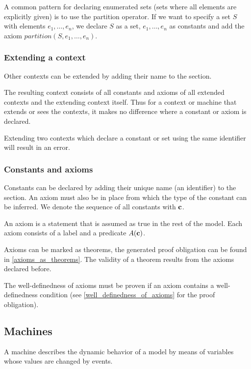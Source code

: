 A common pattern for declaring enumerated sets (sets where all elements are explicitly given)
is to use the partition operator. If we want to specify a set $S$ with elements $e_1,\ldots,e_n$,
we declare $S$ as a set, $e_1,\ldots,e_n$ as constants and add the axiom $partition(S,e_1,\ldots,e_n)$.

\subsubsection{Extending a context}
\label{extendind_a_context}
Other contexts can be extended by adding their name to the  section.

The resulting context consists of all constants and axioms of all extended contexts and the extending context itself.
Thus for a context or machine that extends or sees the contexts, it makes no difference where a constant or axiom is declared.

Extending two contexts which declare a constant or set using the same identifier will result in an error.

\subsubsection{Constants and axioms}
\label{constants_and_axioms}
Constants can be declared by adding their unique name (an identifier) to the  section.
An axiom must also be in place from which the type of the constant can be inferred.
We denote the sequence of all constants with $\mathbf{c}$.

An axiom is a statement that is assumed as true in the rest of the model.
Each axiom consists of a label and a predicate $A(\mathbf{c})$.

Axioms can be marked as theorems,
  the generated proof obligation can be found in \ref{axioms_as_theorems}.
The validity of a theorem results from the axioms declared before.

The well-definedness of axioms must be proven if an axiom contains a well-definedness condition
  (see \ref{well_definedness_of_axioms} for the proof obligation).

\subsection{Machines}
\label{machine}

A machine describes the dynamic behavior of a model by means of variables whose values are changed by events.

